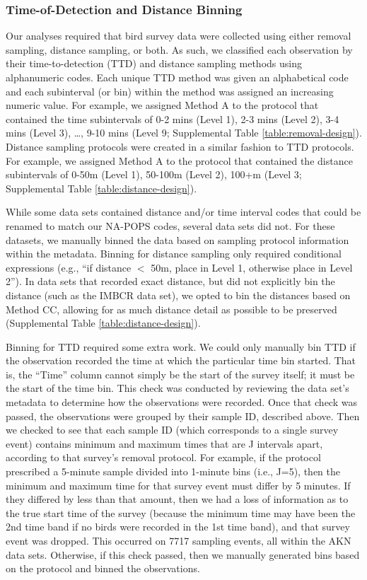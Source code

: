 \subsubsection{Time-of-Detection and Distance Binning}
\par Our analyses required that bird survey data were collected using either removal sampling, distance sampling, or both. As such, we classified each observation by their time-to-detection (TTD) and distance sampling methods using alphanumeric codes. Each unique TTD method was given an alphabetical code and each subinterval (or bin) within the method was assigned an increasing numeric value. For example, we assigned Method A to the protocol that contained the time subintervals of 0-2 mins (Level 1), 2-3 mins (Level 2), 3-4 mins (Level 3), …, 9-10 mins (Level 9; Supplemental Table \ref{table:removal-design}). Distance sampling protocols were created in a similar fashion to TTD protocols. For example, we assigned Method A to the protocol that contained the distance subintervals of 0-50m (Level 1), 50-100m (Level 2), 100+m (Level 3; Supplemental Table \ref{table:distance-design}).

\par While some data sets contained distance and/or time interval codes that could be renamed to match our NA-POPS codes, several data sets did not. For these datasets, we manually binned the data based on sampling protocol information within the metadata. Binning for distance sampling only required conditional expressions (e.g., “if distance $<$ 50m, place in Level 1, otherwise place in Level 2”). In data sets that recorded exact distance, but did not explicitly bin the distance (such as the IMBCR data set), we opted to bin the distances based on Method CC, allowing for as much distance detail as possible to be preserved (Supplemental Table \ref{table:distance-design}). 

\par Binning for TTD required some extra work. We could only manually bin TTD if the observation recorded the time at which the particular time bin started. That is, the ``Time” column cannot simply be the start of the survey itself; it must be the start of the time bin. This check was conducted by reviewing the data set’s metadata to determine how the observations were recorded. Once that check was passed, the observations were grouped by their sample ID, described above. Then we checked to see that each sample ID (which corresponds to a single survey event) contains minimum and maximum times that are J intervals apart, according to that survey’s removal protocol. For example, if the protocol prescribed a 5-minute sample divided into 1-minute bins (i.e., J=5), then the minimum and maximum time for that survey event must differ by 5 minutes. If they differed by less than that amount, then we had a loss of information as to the true start time of the survey (because the minimum time may have been the 2nd time band if no birds were recorded in the 1st time band), and that survey event was dropped. This occurred on 7717 sampling events, all within the AKN data sets. Otherwise, if this check passed, then we manually generated bins based on the protocol and binned the observations.

